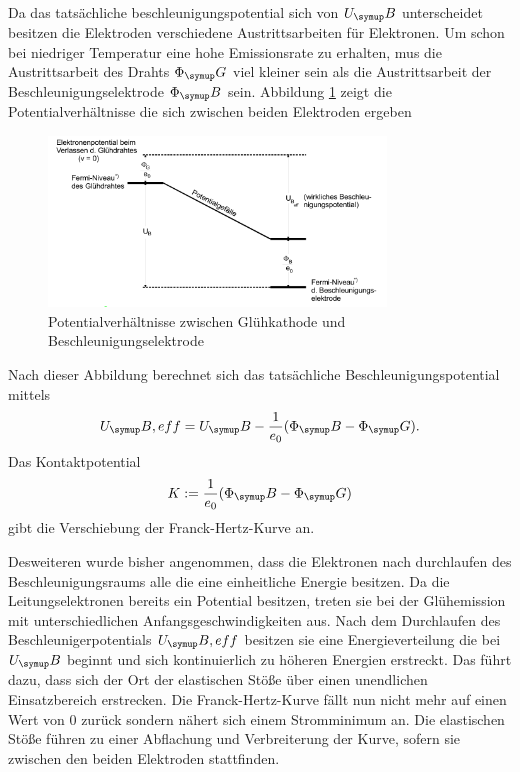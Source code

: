 Da das tatsächliche beschleunigungspotential sich von $U_\su{B}$ unterscheidet
besitzen die Elektroden verschiedene Austrittsarbeiten für Elektronen.
Um schon bei niedriger Temperatur eine hohe Emissionsrate zu erhalten, mus die
Austrittsarbeit des Drahts $\Phi_\su{G}$ viel kleiner sein als die
Austrittsarbeit der Beschleunigungselektrode $\Phi_\su{B}$ sein.
Abbildung \ref{fig:pot} zeigt die Potentialverhältnisse die sich zwischen beiden
Elektroden ergeben
\begin{figure}
  \centering
  \includegraphics[width=0.8\textwidth]{bilder/potential.pdf}
  \caption{Potentialverhältnisse zwischen Glühkathode und Beschleunigungselektrode
  \cite{601}}
  \label{fig:pot}
\end{figure}
Nach dieser Abbildung berechnet sich das tatsächliche Beschleunigungspotential
mittels
\begin{equation}
  U_\su{B,eff}=U_\su{B}-\frac{1}{e_0}(\Phi_\su{B}-\Phi_\su{G}).
\end{equation}
Das Kontaktpotential
\begin{equation}
  K:= \frac{1}{e_0}(\Phi_\su{B}-\Phi_\su{G})
\end{equation}
gibt die Verschiebung der Franck-Hertz-Kurve an.

Desweiteren wurde bisher angenommen, dass die Elektronen nach durchlaufen des
Beschleunigungsraums alle die eine einheitliche Energie besitzen. Da die
Leitungselektronen bereits ein Potential besitzen, treten sie bei der
Glühemission mit unterschiedlichen Anfangsgeschwindigkeiten aus. Nach dem
Durchlaufen des Beschleunigerpotentials $U_\su{B,eff}$ besitzen sie eine
Energieverteilung die bei $U_\su{B}$ beginnt und sich kontinuierlich zu
höheren Energien erstreckt. Das führt dazu, dass sich der Ort der elastischen
Stöße über einen unendlichen Einsatzbereich erstrecken. Die Franck-Hertz-Kurve
fällt nun nicht mehr auf einen Wert von 0 zurück sondern nähert sich einem
Stromminimum an. Die elastischen Stöße führen zu einer Abflachung und Verbreiterung
der Kurve, sofern sie zwischen den beiden Elektroden stattfinden.

